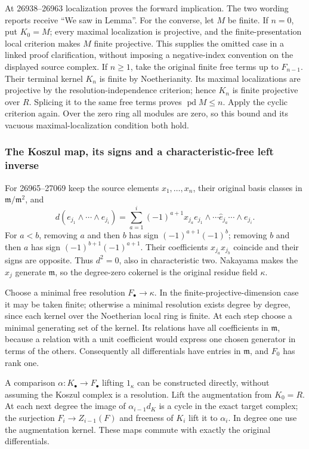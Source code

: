 At 26938--26963 localization proves the forward implication. The two wording reports receive ``We saw in Lemma''. For the converse, let \(M\) be finite. If \(n=0\), put \(K_0=M\); every maximal localization is projective, and the finite-presentation local criterion makes \(M\) finite projective. This supplies the omitted case in a linked proof clarification, without imposing a negative-index convention on the displayed source complex. If \(n\ge1\), take the original finite free terms up to \(F_{n-1}\). Their terminal kernel \(K_n\) is finite by Noetherianity. Its maximal localizations are projective by the resolution-independence criterion; hence \(K_n\) is finite projective over \(R\). Splicing it to the same free terms proves \(\operatorname{pd}M\le n\). Apply the cyclic criterion again. Over the zero ring all modules are zero, so this bound and its vacuous maximal-localization condition both hold.

\subsubsection{The Koszul map, its signs and a characteristic-free left inverse}\label{the-koszul-map-its-signs-and-a-characteristic-free-left-inverse}

For 26965--27069 keep the source elements \(x_1,\ldots,x_n\), their original basis classes in \(\mathfrak m/\mathfrak m^2\), and \[
d(e_{j_1}\wedge\cdots\wedge e_{j_i})
=\sum_{a=1}^i(-1)^{a+1}x_{j_a}
 e_{j_1}\wedge\cdots\widehat e_{j_a}\cdots\wedge e_{j_i}.
\] For \(a<b\), removing \(a\) and then \(b\) has sign \((-1)^{a+1}(-1)^b\); removing \(b\) and then \(a\) has sign \((-1)^{b+1}(-1)^{a+1}\). Their coefficients \(x_{j_a}x_{j_b}\) coincide and their signs are opposite. Thus \(d^2=0\), also in characteristic two. Nakayama makes the \(x_j\) generate \(\mathfrak m\), so the degree-zero cokernel is the original residue field \(\kappa\).

Choose a minimal free resolution \(F_\bullet\to\kappa\). In the finite-projective-dimension case it may be taken finite; otherwise a minimal resolution exists degree by degree, since each kernel over the Noetherian local ring is finite. At each step choose a minimal generating set of the kernel. Its relations have all coefficients in \(\mathfrak m\), because a relation with a unit coefficient would express one chosen generator in terms of the others. Consequently all differentials have entries in \(\mathfrak m\), and \(F_0\) has rank one.

A comparison \(\alpha:K_\bullet\to F_\bullet\) lifting \(1_\kappa\) can be constructed directly, without assuming the Koszul complex is a resolution. Lift the augmentation from \(K_0=R\). At each next degree the image of \(\alpha_{i-1}d_K\) is a cycle in the exact target complex; the surjection \(F_i\to Z_{i-1}(F)\) and freeness of \(K_i\) lift it to \(\alpha_i\). In degree one use the augmentation kernel. These maps commute with exactly the original differentials.

